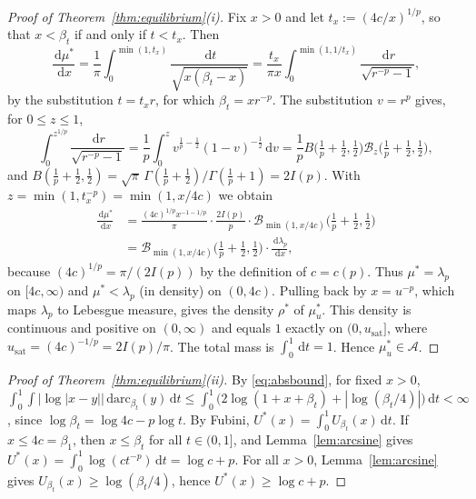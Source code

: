 \documentclass{amsart}
\theoremstyle{definition}
\theoremstyle{remark}
\numberwithin{equation}{section}
\newcommand{\cA}{\mathcal{A}}
\newcommand{\cB}{\mathcal{B}}
\newcommand{\dd}{\,\mathrm{d}}
\newcommand{\arc}{\mathrm{arc}}
\newcommand{\usat}{u_{\mathrm{sat}}}
\begin{document}
\begin{proof}[Proof of Theorem~\ref{thm:equilibrium}(i)]
Fix $x>0$ and let $t_x:=(4c/x)^{1/p}$, so that $x<\beta_t$ if and only if $t<t_x$. Then
\[
  \frac{\dd\mu^*}{\dd x}=\frac1\pi\int_0^{\min(1,t_x)}\frac{\dd t}{\sqrt{x(\beta_t-x)}}
  =\frac{t_x}{\pi x}\int_0^{\min(1,1/t_x)}\frac{\dd r}{\sqrt{r^{-p}-1}},
\]
by the substitution $t=t_xr$, for which $\beta_t=xr^{-p}$. The substitution $v=r^p$ gives, for $0\le z\le1$,
\[
  \int_0^{z^{1/p}}\frac{\dd r}{\sqrt{r^{-p}-1}}=\frac1p\int_0^zv^{\frac1p-\frac12}(1-v)^{-\frac12}\dd v
  =\frac1pB\bigl(\tfrac1p+\tfrac12,\tfrac12\bigr)\cB_z\bigl(\tfrac1p+\tfrac12,\tfrac12\bigr),
\]
and $B(\frac1p+\frac12,\frac12)=\sqrt\pi\,\Gamma(\frac1p+\frac12)/\Gamma(\frac1p+1)=2I(p)$. With
$z=\min(1,t_x^{-p})=\min(1,x/4c)$ we obtain
\begin{align*}
  \frac{\dd\mu^*}{\dd x}&=\frac{(4c)^{1/p}x^{-1-1/p}}{\pi}\cdot\frac{2I(p)}{p}\cdot\cB_{\min(1,x/4c)}
  \bigl(\tfrac1p+\tfrac12,\tfrac12\bigr)\\
  &=\cB_{\min(1,x/4c)}\bigl(\tfrac1p+\tfrac12,\tfrac12\bigr)\cdot\frac{\dd\lambda_p}{\dd x},
\end{align*}
because $(4c)^{1/p}=\pi/(2I(p))$ by the definition of $c=c(p)$. Thus $\mu^*=\lambda_p$ on $[4c,\infty)$ and
$\mu^*<\lambda_p$ (in density) on $(0,4c)$. Pulling back by $x=u^{-p}$, which maps $\lambda_p$ to Lebesgue measure, gives
the density $\rho^*$ of $\mu^*_u$. This density is continuous and positive on $(0,\infty)$ and equals $1$ exactly on
$(0,\usat]$, where $\usat=(4c)^{-1/p}=2I(p)/\pi$. The total mass is $\int_0^1\dd t=1$. Hence $\mu^*_u\in\cA$.
\end{proof}

\begin{proof}[Proof of Theorem~\ref{thm:equilibrium}(ii)]
By \eqref{eq:absbound}, for fixed $x>0$,
$\int_0^1\int|\log|x-y||\dd\arc_{\beta_t}(y)\dd t\le\int_0^1\bigl(2\log(1+x+\beta_t)+|\log(\beta_t/4)|\bigr)\dd t<\infty$,
since $\log\beta_t=\log4c-p\log t$. By Fubini, $U^*(x)=\int_0^1U_{\beta_t}(x)\dd t$. If $x\le4c=\beta_1$, then
$x\le\beta_t$ for all $t\in(0,1]$, and Lemma~\ref{lem:arcsine} gives
$U^*(x)=\int_0^1\log(ct^{-p})\dd t=\log c+p$. For all $x>0$, Lemma~\ref{lem:arcsine} gives
$U_{\beta_t}(x)\ge\log(\beta_t/4)$, hence $U^*(x)\ge\log c+p$.
\end{proof}
\end{document}
